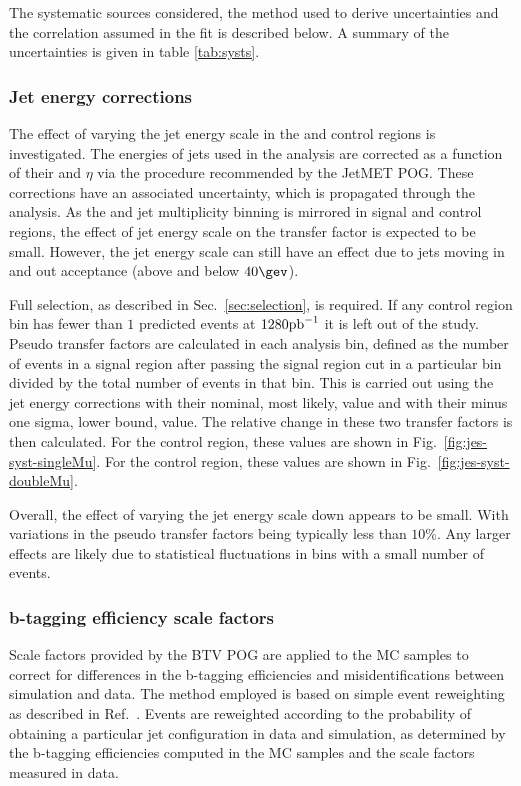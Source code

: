 The systematic sources considered, the method used to derive uncertainties and the 
correlation assumed in the fit is described below.
A summary of the uncertainties is given in table \ref{tab:systs}.


\subsubsection{Jet energy corrections}
The effect of varying the jet energy scale in
the \mj and \mmj control regions is investigated.  The energies of
jets used in the analysis are corrected as a function of their \pt and
$\eta$ via the procedure recommended by the JetMET POG. These
corrections have an associated uncertainty, which is propagated through the analysis. 
As the \scalht and jet multiplicity binning is mirrored in signal and control regions, 
the effect of jet energy scale on the transfer factor is expected to be small. 
However, the jet energy scale can still have an
effect due to jets moving in and out acceptance (above and below
$40\gev$).

Full selection, as described in Sec.~\ref{sec:selection}, is required.
If any control region bin has fewer than $1$ predicted events at
$1280\ipb$ it is left out of the study.  Pseudo transfer factors are
calculated in each analysis bin, defined as the number of events in a
signal region after passing the signal region \alphat cut in a
particular bin divided by the total number of events in that bin. This
is carried out using the jet energy corrections with their nominal,
most likely, value and with their minus one sigma, lower bound,
value. The relative change in these two transfer factors is then
calculated. For the \mj control region, these values are shown in
Fig.~\ref{fig:jes-syst-singleMu}. For the \mmj control region, these
values are shown in Fig.~\ref{fig:jes-syst-doubleMu}.

Overall, the effect of varying the jet energy scale down appears to be
small. With variations in the pseudo transfer factors being typically
less than $10\%$. Any larger effects are likely due to statistical
fluctuations in bins with a small number of events.

\subsubsection{b-tagging efficiency scale factors}

Scale factors provided by the BTV POG are applied to the MC samples
to correct for differences in the b-tagging efficiencies and 
misidentifications between simulation and data. The method employed is
based on simple event reweighting as described in
Ref.~\cite{btagSFMethods}. Events are reweighted according to the
probability of obtaining a particular jet configuration in data
and simulation, as determined by the b-tagging efficiencies computed
in the MC samples and the scale factors measured in data.

